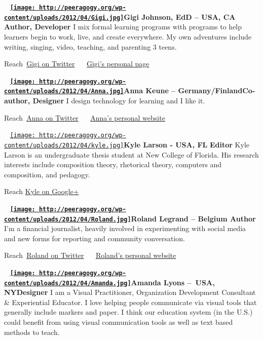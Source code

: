 ~
\textbf{\href{http://peeragogy.org/wp-content/uploads/2012/04/Gigi.jpg}{\texttt{[image: http://peeragogy.org/wp-content/uploads/2012/04/Gigi.jpg]}}Gigi
Johnson, EdD -- USA, CA Author, Developer} I mix formal learning
programs with programs to help learners begin to work, live, and create
everywhere. My own adventures include writing, singing, video, teaching,
and parenting 3 teens.

Reach~\href{http://twitter.com/maremel}{Gigi on Twitter} ~\textbar{}
~\href{http://maremel.com}{Gigi's personal page}

~
\textbf{\href{http://peeragogy.org/wp-content/uploads/2012/04/Anna.jpg}{\texttt{[image: http://peeragogy.org/wp-content/uploads/2012/04/Anna.jpg]}}Anna
Keune -- Germany/Finland}\textbf{Co-author, Designer} I design
technology for learning and I like it.

Reach~\href{https://twitter.com/\#!/akeune}{Anna on Twitter} ~\textbar{}
~\href{www.annakeune.com}{Anna's personal website}

~
\href{http://peeragogy.org/resources/meet-the-team/kyle/}{\texttt{[image: http://peeragogy.org/wp-content/uploads/2012/04/kyle.jpg]}}\textbf{Kyle
Larson - USA, FL} \textbf{Editor} Kyle Larson is an undergraduate thesis
student at New College of Florida. His research interests include
composition theory, rhetorical theory, computers and composition, and
pedagogy.

Reach \href{https://plus.google.com/110988036495982155492/posts}{Kyle on
Google+}

~
\textbf{\href{http://peeragogy.org/wp-content/uploads/2012/04/Roland.jpg}{\texttt{[image: http://peeragogy.org/wp-content/uploads/2012/04/Roland.jpg]}}Roland
Legrand -- Belgium Author} I'm a financial journalist, heavily involved
in experimenting with social media and new forms for reporting and
community conversation.

Reach~\href{http://www.twitter.com/rolandlegrand}{Roland on Twitter}
~\textbar{} ~\href{http://www.mixedrealities.com}{Roland's personal
website}

~
\textbf{\href{http://peeragogy.org/wp-content/uploads/2012/04/Amanda.jpg}{\texttt{[image: http://peeragogy.org/wp-content/uploads/2012/04/Amanda.jpg]}}Amanda
Lyons --~\textbf{USA}, NY}\textbf{Designer} I am a Visual Practitioner,
Organization Development Consultant \& Experiential Educator. I love
helping people communicate via visual tools that generally include
markers and paper. I think our education system (in the U.S.) could
benefit from using visual communication tools as well as text based
methods to teach.

